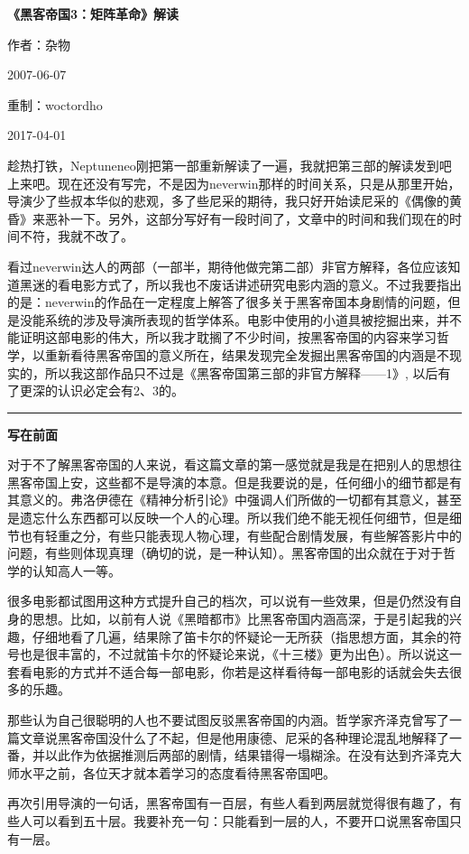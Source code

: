 \documentclass[UTF8]{ctexart}
\newcommand{\myparsep}{\noindent \rule[0.5ex]{\linewidth}{1pt}}
\newcommand{\mysection}[1]{\vspace{1ex} {\centering \bf #1 \par} \vspace{1ex}}
\begin{document}
\centerline{\bf \fontsize{15.75pt} \baselineskip \selectfont《黑客帝国3：矩阵革命》解读}
\vspace{12pt}
\centerline{作者：杂物}
\centerline{2007-06-07}
\centerline{重制：woctordho}
\centerline{2017-04-01}
\vspace{12pt}

趁热打铁，Neptuneneo刚把第一部重新解读了一遍，我就把第三部的解读发到吧上来吧。现在还没有写完，不是因为neverwin那样的时间关系，只是从那里开始，导演少了些叔本华似的悲观，多了些尼采的期待，我只好开始读尼采的《偶像的黄昏》来恶补一下。另外，这部分写好有一段时间了，文章中的时间和我们现在的时间不符，我就不改了。

看过neverwin达人的两部（一部半，期待他做完第二部）非官方解释，各位应该知道黑迷的看电影方式了，所以我也不废话讲述研究电影内涵的意义。不过我要指出的是：neverwin的作品在一定程度上解答了很多关于黑客帝国本身剧情的问题，但是没能系统的涉及导演所表现的哲学体系。电影中使用的小道具被挖掘出来，并不能证明这部电影的伟大，所以我才耽搁了不少时间，按黑客帝国的内容来学习哲学，以重新看待黑客帝国的意义所在，结果发现完全发掘出黑客帝国的内涵是不现实的，所以我这部作品只不过是《黑客帝国第三部的非官方解释——1》, 以后有了更深的认识必定会有2、3的。

\myparsep

\mysection{写在前面}

对于不了解黑客帝国的人来说，看这篇文章的第一感觉就是我是在把别人的思想往黑客帝国上安，这些都不是导演的本意。但是我要说的是，任何细小的细节都是有其意义的。弗洛伊德在《精神分析引论》中强调人们所做的一切都有其意义，甚至是遗忘什么东西都可以反映一个人的心理。所以我们绝不能无视任何细节，但是细节也有轻重之分，有些只能表现人物心理，有些配合剧情发展，有些解答影片中的问题，有些则体现真理（确切的说，是一种认知）。黑客帝国的出众就在于对于哲学的认知高人一等。

很多电影都试图用这种方式提升自己的档次，可以说有一些效果，但是仍然没有自身的思想。比如，以前有人说《黑暗都市》比黑客帝国内涵高深，于是引起我的兴趣，仔细地看了几遍，结果除了笛卡尔的怀疑论一无所获（指思想方面，其余的符号也是很丰富的，不过就笛卡尔的怀疑论来说，《十三楼》更为出色）。所以说这一套看电影的方式并不适合每一部电影，你若是这样看待每一部电影的话就会失去很多的乐趣。

那些认为自己很聪明的人也不要试图反驳黑客帝国的内涵。哲学家齐泽克曾写了一篇文章说黑客帝国没什么了不起，但是他用康德、尼采的各种理论混乱地解释了一番，并以此作为依据推测后两部的剧情，结果错得一塌糊涂。在没有达到齐泽克大师水平之前，各位天才就本着学习的态度看待黑客帝国吧。

再次引用导演的一句话，黑客帝国有一百层，有些人看到两层就觉得很有趣了，有些人可以看到五十层。我要补充一句：只能看到一层的人，不要开口说黑客帝国只有一层。
\end{document}
